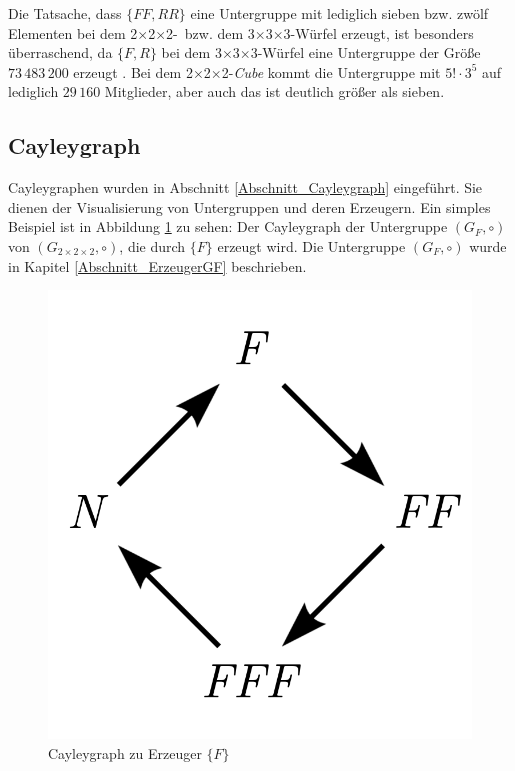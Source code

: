 \documentclass[12pt,a4paper, usenames, dvipsnames]{article}
\theoremstyle{mystyle}
\theoremstyle{definition}
\newcommand{\Gtwo}{\ensuremath{G_{2\times 2\times 2}}}
\newcommand{\Ttwo}{2$\times$2$\times$2-}
\newcommand{\Tthree}{3$\times$3$\times$3-}
\begin{document}
Die Tatsache, dass $\{ FF, RR \}$ eine Untergruppe mit lediglich sieben bzw. zwölf Elementen bei dem \Ttwo \  bzw. dem \Tthree Würfel erzeugt, ist besonders überraschend, da $\{ F, R \}$ bei dem  \Tthree Würfel eine Untergruppe der Größe $73\, 483\, 200$ erzeugt \cite{TD}. 
Bei dem \Ttwo \textit{Cube} kommt die Untergruppe mit $5! \cdot 3^5$ auf lediglich $29 \, 160$ Mitglieder, aber auch das ist deutlich größer als sieben.

%
%
%
%
%
%
%
%
%
%
%
%
%
%
%
%

\subsection{Cayleygraph}

Cayleygraphen wurden in Abschnitt \ref{Abschnitt_Cayleygraph} eingeführt. Sie dienen der Visualisierung von Untergruppen und deren Erzeugern.
Ein simples Beispiel ist in Abbildung \ref{Abbildung_CayleygraphF} zu sehen: Der Cayleygraph der Untergruppe $(G_F, \circ)$ von $(\Gtwo, \circ)$, die durch $\{ F \}$  erzeugt wird. Die Untergruppe $(G_F, \circ)$ wurde in Kapitel \ref{Abschnitt_ErzeugerGF} beschrieben.

\begin{figure}[H]
\centering
\includegraphics[scale=0.6]{Cayleygraph1.png}
\caption{Cayleygraph zu Erzeuger $\{ F \}$}
\label{Abbildung_CayleygraphF}
\end{figure}
\end{document}
